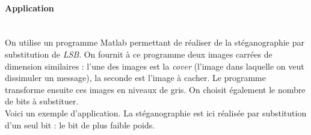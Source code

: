 \paragraph{Application}~\\\indent
On utilise un programme \textsf{Matlab} permettant de réaliser de la stéganographie par substitution de \emph{LSB}. On fournit à ce programme deux images carrées de dimension similaires : l'une des images est la \emph{cover} (l'image dans laquelle on veut dissimuler un message), la seconde est l'image à cacher. Le programme transforme ensuite ces images en niveaux de gris. On choisit également le nombre de bits à substituer.\\

Voici un exemple d'application. La stéganographie est ici réalisée par substitution d'un seul bit : le bit de plus faible poids. 

